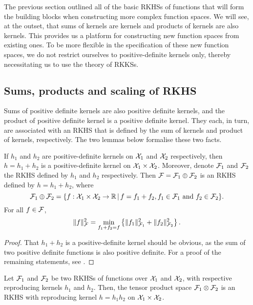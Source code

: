 
The previous section outlined all of the basic RKHSs of functions that will form the building blocks when constructing more complex function spaces.
We will see, at the outset, that sums of kernels are kernels and products of kernels are also kernels. 
This provides us a platform for constructing new function spaces from existing ones.
To be more flexible in the specification of these new function spaces, we do not restrict ourselves to positive-definite kernels only, thereby necessitating us to use the theory of RKKSs.

\subsection{Sums, products and scaling of RKHS}

Sums of positive definite kernels are also positive definite kernels, and the product of positive definite kernel is a positive definite kernel.
They each, in turn, are associated with an RKHS that is defined by the sum of kernels and product of kernels, respectively.
The two lemmas below formalise these two facts. 

\begin{lemma}\label{thm:sumkernels}
  If $h_1$ and $h_2$ are positive-definite kernels on ${\mathcal X}_1$ and ${\mathcal X}_2$ respectively, then $h = h_1 + h_2$ is a positive-definite kernel on ${\mathcal X}_1 \times {\mathcal X}_2$.
  Moreover, denote ${\mathcal F}_1$ and ${\mathcal F}_2$ the RKHS defined by $h_1$ and $h_2$ respectively.
  Then ${\mathcal F} = {\mathcal F}_1 \oplus {\mathcal F}_2$ is an RKHS defined by $h = h_1 + h_2$, where
  \[
    {\mathcal F}_1 \oplus {\mathcal F}_2 = \{ f:{\mathcal X}_1\times{\mathcal X}_2 \to\mathbb{R} \,|\, f = f_1 + f_2, f_1\in{\mathcal F}_1 \text{ and } f_2\in{\mathcal F}_2 \}.
  \]
  For all $f\in{\mathcal F}$,
  \[
    \lVert f\rVert_{\mathcal F}^2 = \min_{f_1+f_2=f} \left\{ \lVert f_1\rVert_{{\mathcal F}_1}^2 + \lVert f_2\rVert_{{\mathcal F}_2}^2 \right\}.
  \]
\end{lemma}

\begin{proof}
  That $h_1+h_2$ is a positive-definite kernel should be obvious, as the sum of two positive definite functions is also positive definite.
  For a proof of the remaining statements, see \citet[Thm. 5]{berlinet2011reproducing}.
\end{proof}

\begin{lemma}\label{thm:prodkernels}
  Let ${\mathcal F}_1$ and ${\mathcal F}_2$ be two RKHSs of functions over ${\mathcal X}_1$ and ${\mathcal X}_2$, with respective reproducing kernels $h_1$ and $h_2$.
  Then, the tensor product space ${\mathcal F}_1 \otimes {\mathcal F}_2$ is an RKHS with reproducing kernel $h = h_1 h_2$ on ${\mathcal X}_1 \times {\mathcal X}_2$.
\end{lemma}


